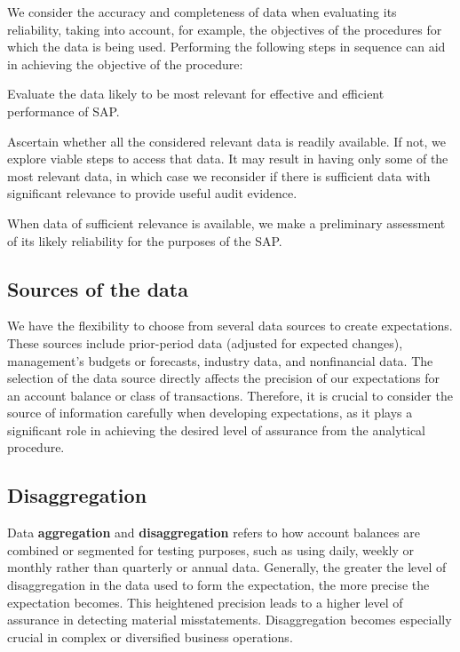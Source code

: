 We consider the accuracy and completeness of data when evaluating its reliability, taking into account, for example, the objectives of the procedures for which the data is being used. Performing the following steps in sequence can aid in achieving the objective of the procedure:

\begin{compactitem}
\item Evaluate the data likely to be most relevant for effective and efficient performance of SAP.
\item Ascertain whether all the considered relevant data is readily available. If not, we explore viable steps to access that data. It may result in having only some of the most relevant data, in which case we reconsider if there is sufficient data with significant relevance to provide useful audit evidence.
\item When data of sufficient relevance is available, we make a preliminary assessment of its likely reliability for the purposes of the SAP. 
\end{compactitem}


\subsection{Sources of the data} %
\label{sub:source_of_the_data}

We have the flexibility to choose from several data sources to create expectations. These sources include prior-period data (adjusted for expected changes), management's budgets or forecasts, industry data, and nonfinancial data. The selection of the data source directly affects the precision of our expectations for an account balance or class of transactions. Therefore, it is crucial to consider the source of information carefully when developing expectations, as it plays a significant role in achieving the desired level of assurance from the analytical procedure.


\subsection{Disaggregation} %
\label{sub:disaggregation}

Data \textbf{aggregation} and \textbf{disaggregation} refers to how account balances are combined or segmented for testing purposes, such as using daily, weekly or monthly rather than quarterly or annual data. 
Generally, the greater the level of disaggregation in the data used to form the expectation, the more precise the expectation becomes. 
This heightened precision leads to a higher level of assurance in detecting material misstatements. 
Disaggregation becomes especially crucial in complex or diversified business operations.

